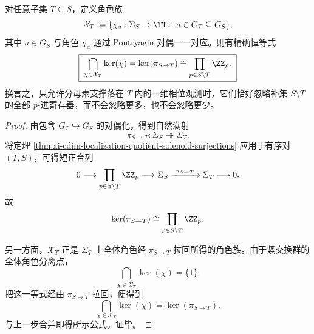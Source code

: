 \begin{theorem}\label{thm:xi-cdim-localization-solenoid-character-family-sees-exact-prime-register-quotient}
对任意子集 \(T\subseteq S\)，定义角色族
\[
\mathcal X_T
:=
\{\chi_a:\Sigma_S\to \TT:\ a\in G_T\subseteq G_S\},
\]
其中 \(a\in G_S\) 与角色 \(\chi_a\) 通过 Pontryagin 对偶一一对应。则有精确恒等式
\[
\boxed{\;
\bigcap_{\chi\in\mathcal X_T}\ker(\chi)
=
\ker(\pi_{S\to T})
\cong
\prod_{p\in S\setminus T}\ZZ_p.\;}
\]
换言之，只允许分母素支撑落在 \(T\) 内的一维相位观测时，它们恰好忽略补集 \(S\setminus T\) 的全部 \(p\)-进寄存器，而不会忽略更多，也不会忽略更少。
\end{theorem}
\begin{proof}
由包含 \(G_T\hookrightarrow G_S\) 的对偶化，得到自然满射
\[
\pi_{S\to T}:\Sigma_S\twoheadrightarrow \Sigma_T.
\]
将定理 \ref{thm:xi-cdim-localization-quotient-solenoid-surjections} 应用于有序对 \((T,S)\)，可得短正合列
\[
0\longrightarrow \prod_{p\in S\setminus T}\ZZ_p
\longrightarrow \Sigma_S
\xrightarrow{\ \pi_{S\to T}\ }
\Sigma_T
\longrightarrow 0.
\]
故
\[
\ker(\pi_{S\to T})\cong \prod_{p\in S\setminus T}\ZZ_p.
\]

另一方面，\(\mathcal X_T\) 正是 \(\Sigma_T\) 上全体角色经 \(\pi_{S\to T}\) 拉回所得的角色族。由于紧交换群的全体角色分离点，
\[
\bigcap_{\chi\in \widehat{\Sigma_T}}\ker(\chi)=\{1\}.
\]
把这一等式经由 \(\pi_{S\to T}\) 拉回，便得到
\[
\bigcap_{\chi\in\mathcal X_T}\ker(\chi)=\ker(\pi_{S\to T}).
\]
与上一步合并即得所示公式。证毕。
\end{proof}

\endinput
